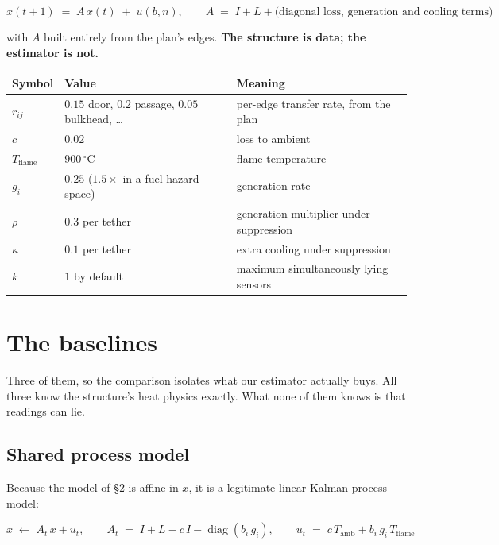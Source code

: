 \documentclass[11pt]{article}
\newcommand{\Tamb}{T_{\mathrm{amb}}}
\newcommand{\Tflame}{T_{\mathrm{flame}}}
\newcommand{\degC}{^\circ\mathrm{C}}
\begin{document}
\begin{equation}
  x(t{+}1) \;=\; A\,x(t) \;+\; u(b, n), \qquad
  A \;=\; I + L + \text{(diagonal loss, generation and cooling terms)}
\end{equation}

with $A$ built entirely from the plan's edges. \textbf{The structure is data; the estimator is not.}

\begin{center}
\begin{tabular}{@{}lll@{}}
\toprule
\textbf{Symbol} & \textbf{Value} & \textbf{Meaning} \\
\midrule
$r_{ij}$ & $0.15$ door, $0.2$ passage, $0.05$ bulkhead, \ldots & per-edge transfer rate, from the plan \\
$c$      & $0.02$          & loss to ambient \\
$\Tflame$& $900\,\degC$    & flame temperature \\
$g_i$    & $0.25$ ($1.5\times$ in a fuel-hazard space) & generation rate \\
$\rho$   & $0.3$ per tether & generation multiplier under suppression \\
$\kappa$ & $0.1$ per tether & extra cooling under suppression \\
$k$      & $1$ by default  & maximum simultaneously lying sensors \\
\bottomrule
\end{tabular}
\end{center}

\section{The baselines}

Three of them, so the comparison isolates what our estimator actually buys. All three know the structure's heat physics exactly. What none of them knows is that readings can lie.

\subsection*{Shared process model}

Because the model of \S2 is affine in $x$, it is a legitimate linear Kalman process model:

\begin{equation}
  x \;\leftarrow\; A_t\,x + u_t,
  \qquad
  A_t \;=\; I + L - c\,I - \operatorname{diag}(b_i\,g_i),
  \qquad
  u_t \;=\; c\,\Tamb + b_i\,g_i\,\Tflame
\end{equation}
\end{document}
